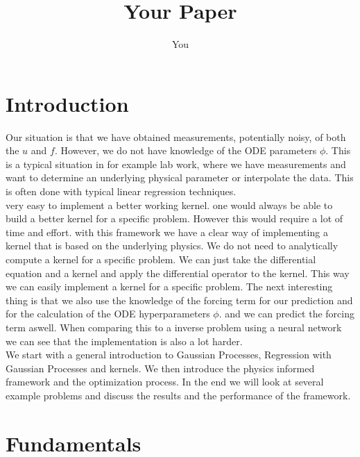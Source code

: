 \documentclass{article}
\title{Your Paper}
\author{You}
\begin{document}
\maketitle

\newpage
\begin{abstract}

\end{abstract}

\section{Introduction}
Our situation is that we have obtained measurements, potentially noisy, of both
the $u$ and $f$. However, we do not have knowledge of the ODE parameters
$\phi$. This is a typical situation in for example lab work, where we have
measurements and want to determine an underlying physical parameter or
interpolate the data. This is often done with typical linear regression
techniques.\\ very easy to implement a better working kernel. one would always be able to build a better kernel for a specific problem. However this would require a lot of time and effort. with this framework we have a clear way of implementing a kernel that is based on the underlying physics. We do not need to analytically compute a kernel for a specific problem. We can just take the differential equation and a kernel and apply the differential operator to the kernel. This way we can easily implement a kernel for a specific problem. The next interesting thing is that we also use the knowledge of the forcing term for our prediction and for the calculation of the ODE hyperparameters $\phi$. and we can predict the forcing term aswell. When comparing this to a inverse problem using a neural network we can see that the implementation is also a lot harder.\\
We start with a general introduction to Gaussian Processes, Regression with Gaussian Processes and kernels. We
then introduce the physics informed framework and the optimization process. In the end we will look at several example problems and discuss the results and the performance of the framework.\\

\section{Fundamentals}
\end{document}
